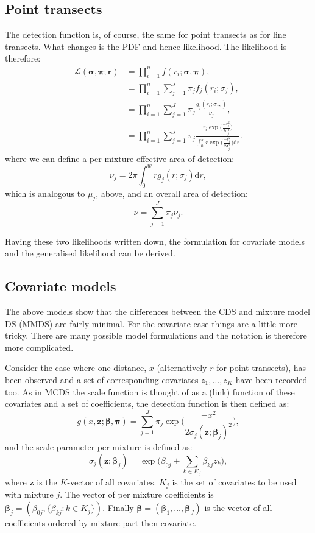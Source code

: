 \subsection{Point transects}
The detection function is, of course, the same for point transects as for line transects. What changes is the PDF and hence likelihood. The likelihood is therefore:
\begin{align}
\mathcal{L}(\bm{\sigma}, \bm{\pi}; \bm{r}) &= \prod_{i=1}^n f(r_i;\bm{\sigma}, \bm{\pi}),\\
&= \prod_{i=1}^n \sum_{j=1}^J \pi_j f_j(r_i; \sigma_j),\\
&= \prod_{i=1}^n \sum_{j=1}^J \pi_j \frac{g_j(r_i; \sigma_j,)}{\nu_j},\\
&= \prod_{i=1}^n \sum_{j=1}^J \pi_j \frac{r_i \exp \Big( \frac{-r_i^2}{2 \sigma_j^2}\Big)}{\int_0^w r  \exp \Big( \frac{-r_i^2}{2 \sigma_j^2}\Big) \text{d}r}.
\label{mmds-pt-likelihood-pdf}
\end{align}
where we can define a per-mixture effective area of detection:
\begin{equation}
\nu_j= 2 \pi \int_0^w r  g_j(r;\sigma_j) \text{d}r,
\end{equation}
which is analogous to $\mu_j$, above, and an overall area of detection:
\begin{equation}
\nu= \sum_{j=1}^J \pi_j \nu_j.
\end{equation}


Having these two likelihoods written down, the formulation for covariate models and the generalised likelihood can be derived.

\subsection{Covariate models}
The above models show that the differences between the CDS and mixture model DS (MMDS) are fairly minimal. For the covariate case things are a little more tricky. There are many possible model formulations and the notation is therefore more complicated.

Consider the case where one distance, $x$ (alternatively $r$ for point transects), has been observed and a set of corresponding covariates $z_1,\dots,z_K$ have been recorded too. As in MCDS the scale function is thought of as a (link) function of these covariates and a set of coefficients, the detection function is then defined as:
\begin{equation*}
g(x, \bm{z};\bm{\beta},\bm{\pi}) = \sum_{j=1}^J \pi_j \exp \Big( \frac{-x^2}{2 \sigma_j(\bm{z};\bm{\beta}_j)^2}\Big),
\label{mmds-detfct-covar}
\end{equation*}
and the scale parameter per mixture is defined as:
\begin{equation*}
\sigma_j(\bm{z};\bm{\beta}_j) = \exp \Big(\beta_{0j} + \sum_{k\in K_j} \beta_{kj} z_k \Big),
\end{equation*}
where $\bm{z}$ is the $K$-vector of all covariates. $K_j$ is the set of covariates to be used with mixture $j$. The vector of per mixture coefficients is $\bm{\beta}_j=(\beta_{0j},\{ \beta_{kj} : k \in K_j\})$. Finally $\bm{\beta}=(\bm{\beta}_1,\dots,\bm{\beta}_J)$ is the vector of all coefficients ordered by mixture part then covariate.

